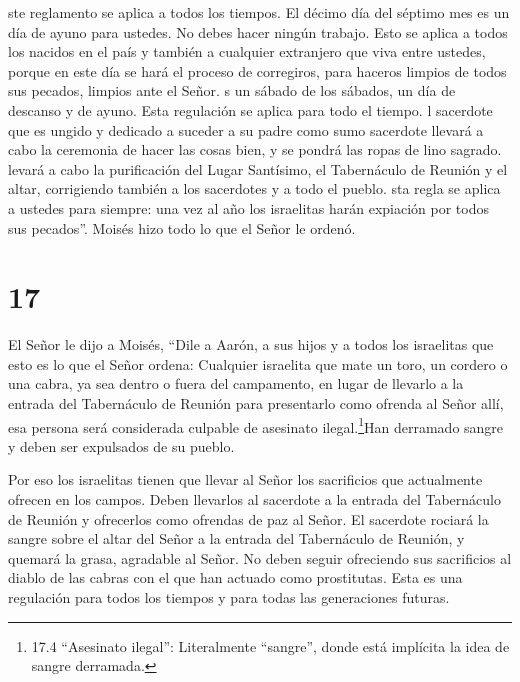  ste reglamento se aplica a todos los tiempos. El décimo
día del séptimo mes es un día de ayuno para ustedes. No debes hacer
ningún trabajo. Esto se aplica a todos los nacidos en el país y también
a cualquier extranjero que viva entre ustedes,  porque en
este día se hará el proceso de corregiros, para haceros limpios de todos
sus pecados, limpios ante el Señor.  s un sábado de los
sábados, un día de descanso y de ayuno. Esta regulación se aplica para
todo el tiempo.  l sacerdote que es ungido y dedicado a
suceder a su padre como sumo sacerdote llevará a cabo la ceremonia de
hacer las cosas bien, y se pondrá las ropas de lino sagrado.
 levará a cabo la purificación del Lugar Santísimo, el
Tabernáculo de Reunión y el altar, corrigiendo también a los sacerdotes
y a todo el pueblo.  sta regla se aplica a ustedes para
siempre: una vez al año los israelitas harán expiación por todos sus
pecados''. Moisés hizo todo lo que el Señor le ordenó.

\hypertarget{section-16}{%
\section{17}\label{section-16}}

 El Señor le dijo a Moisés,  ``Dile a Aarón, a
sus hijos y a todos los israelitas que esto es lo que el Señor ordena:
 Cualquier israelita que mate un toro, un cordero o una
cabra, ya sea dentro o fuera del campamento,  en lugar de
llevarlo a la entrada del Tabernáculo de Reunión para presentarlo como
ofrenda al Señor allí, esa persona será considerada culpable de
asesinato ilegal.\footnote{17.4 ``Asesinato ilegal'': Literalmente
  ``sangre'', donde está implícita la idea de sangre derramada.}Han
derramado sangre y deben ser expulsados de su pueblo.

 Por eso los israelitas tienen que llevar al Señor los
sacrificios que actualmente ofrecen en los campos. Deben llevarlos al
sacerdote a la entrada del Tabernáculo de Reunión y ofrecerlos como
ofrendas de paz al Señor.  El sacerdote rociará la sangre
sobre el altar del Señor a la entrada del Tabernáculo de Reunión, y
quemará la grasa, agradable al Señor.  No deben seguir
ofreciendo sus sacrificios al diablo de las cabras con el que han
actuado como prostitutas. Esta es una regulación para todos los tiempos
y para todas las generaciones futuras.

